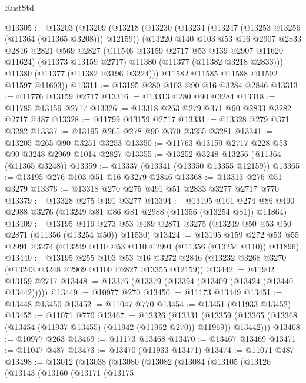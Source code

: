 \begin{lexlean}{RustStd}
\begin{coremodule}
{\begin{coremodule}
{{{{{{{{{{{{{{{{{{{{{{{{{{{{{{{{{@13305 := @13203
    (@13209
      (@13218
        (@13230
          (@13234 (@13247 (@13253 @13256 (@11364 (@11365 @3208))) @12159))
          (@13220
            @140
            @103
            @53
            @16
            @2907
            @2833
            @2846
            @2821
            @569
            @2827
            (@11546 @13159 @2717 @53 @139 @2907 @11620 @11624)
            (@11373 @13159 @2717)
            @11380
            (@11377 (@11382 @3218 @2833)))
          @11380
          (@11377 (@11382 @3196 @3224)))
        @11582
        @11585
        @11588
        @11592
        @11597
        @11603))
@13311 := @13195 @280 @103 @90 @16 @3284 @2846
@13313 := @11776 @13159 @2717
@13316 := @13313 @280 @90 @3284
@13318 := @11785 @13159 @2717
@13326 := @13318 @263 @279 @371 @90 @2833 @3282 @2717 @487
@13328 := @11799 @13159 @2717
@13331 := @13328 @279 @371 @3282
@13337 := @13195 @265 @278 @90 @370 @3255 @3281
@13341 := @13205 @265 @90 @3251 @3253
@13350 := @11763 @13159 @2717 @228 @53 @90 @3248 @2969 @1014 @2827
@13355 := @13252 @3248 @13256 (@11364 (@11365 @3248))
@13359 := @13337 (@13341 (@13350 @13355 @12159))
@13365 := @13195 @276 @103 @51 @16 @3279 @2846
@13368 := @13313 @276 @51 @3279
@13376 := @13318 @270 @275 @491 @51 @2833 @3277 @2717 @770
@13379 := @13328 @275 @491 @3277
@13394 := @13195
    @101
    @274
    @86
    @490
    @2988
    @3276
    (@13249 @81 @86 @81 @2988 (@11356 (@13254 @81)) @11864)
@13409 := @13195
    @119
    @273
    @53
    @489
    @2871
    @3275
    (@13249 @50 @53 @50 @2871 (@11356 (@13254 @50)) @11530)
@13424 := @13195
    @159
    @272
    @53
    @55
    @2991
    @3274
    (@13249 @110 @53 @110 @2991 (@11356 (@13254 @110)) @11896)
@13440 := @13195
    @255
    @103
    @53
    @16
    @3272
    @2846
    (@13232 @3268 @3270 (@13243 @3248 @2969 @1100 @2827 @13355 @12159))
@13442 := @11902 @13159 @2717
@13448 := @13376 (@13379 (@13394 (@13409 (@13424 (@13440 @13442)))))
@13449 := @10977 @270
@13450 := @11173 @13449
@13451 := @13448 @13450
@13452 := @11047 @770
@13454 := @13451 (@11933 @13452)
@13455 := @11071 @770
@13467 := @13326
    (@13331
      (@13359 (@13365 (@13368 (@13454 (@11937 @13455) (@11942 (@11962 @270)) @11969)) @13442)))
@13468 := @10977 @263
@13469 := @11173 @13468
@13470 := @13467 @13469
@13471 := @11047 @487
@13473 := @13470 (@11933 @13471)
@13474 := @11071 @487
@13498 := @13012
    (@13038
      (@13080
        (@13082
          (@13084
            (@13105
              (@13126
                (@13143
                  (@13160
                    (@13171
                      (@13175
}}}}}}}}}}}}}}}}}}}}}}}}}}}}}}}}}
\end{coremodule}}
\end{coremodule}
\end{lexlean}
